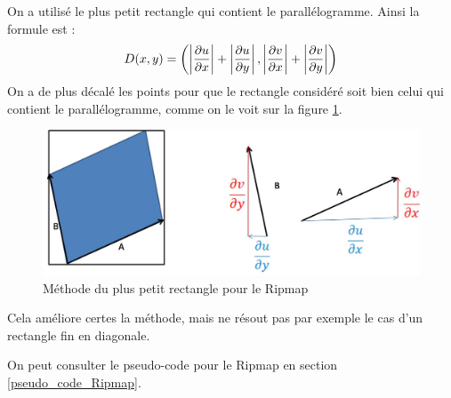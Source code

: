 On a utilisé le plus petit rectangle qui contient le parallélogramme. Ainsi la formule est :
$$D(x,y) = \left( \left|\frac{\partial u}{\partial x}\right|+\left|\frac{\partial u}{\partial y}\right|,\left|\frac{\partial v}{\partial x}\right|+\left|\frac{\partial v}{\partial y}\right|\right)$$
On a de plus décalé les points pour que le rectangle considéré soit bien celui qui contient le parallélogramme, comme on le voit sur la figure \ref{methode_distance_ripmap}.

\begin{figure}[h!]
\centering
\includegraphics[scale=0.5]{methode_distance_ripmap.jpg}
\caption{Méthode du plus petit rectangle pour le Ripmap}
\label{methode_distance_ripmap}
\end{figure}

Cela améliore certes la méthode, mais ne résout pas par exemple le cas d'un rectangle fin en diagonale.

On peut consulter le pseudo-code pour le Ripmap en section \ref{pseudo_code_Ripmap}.
